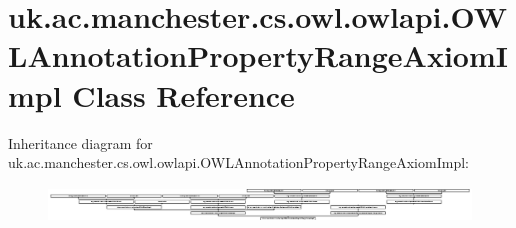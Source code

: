\hypertarget{classuk_1_1ac_1_1manchester_1_1cs_1_1owl_1_1owlapi_1_1_o_w_l_annotation_property_range_axiom_impl}{\section{uk.\-ac.\-manchester.\-cs.\-owl.\-owlapi.\-O\-W\-L\-Annotation\-Property\-Range\-Axiom\-Impl Class Reference}
\label{classuk_1_1ac_1_1manchester_1_1cs_1_1owl_1_1owlapi_1_1_o_w_l_annotation_property_range_axiom_impl}
}
Inheritance diagram for uk.\-ac.\-manchester.\-cs.\-owl.\-owlapi.\-O\-W\-L\-Annotation\-Property\-Range\-Axiom\-Impl\-:\begin{figure}[H]
\begin{center}
\leavevmode
\includegraphics[height=0.956720cm]{classuk_1_1ac_1_1manchester_1_1cs_1_1owl_1_1owlapi_1_1_o_w_l_annotation_property_range_axiom_impl}
\end{center}
\end{figure}

